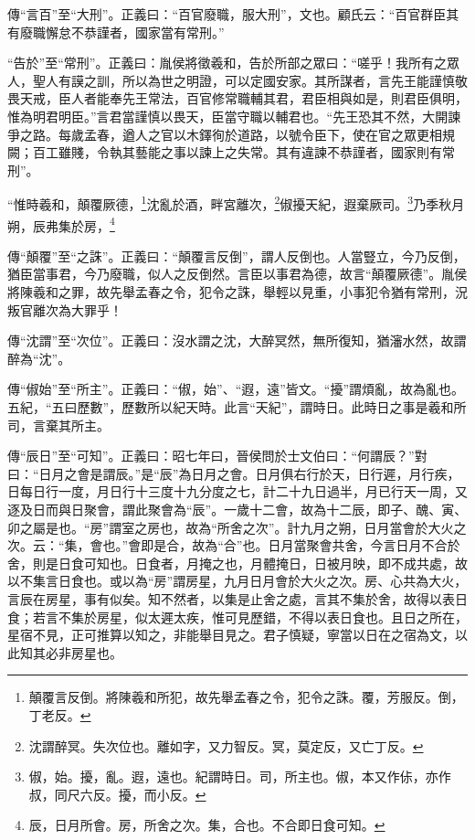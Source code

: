 {\noindent\zhuan{}\fzbyks 傳“言百”至“大刑”。正義曰：“百官廢職，服大刑”，文也。顧氏云：“百官群臣其有廢職懈怠不恭謹者，國家當有常刑。” \par}

{\noindent\shu{}\fzkt “告於”至“常刑”。正義曰：胤侯將徵羲和，告於所部之眾曰：“嗟乎！我所有之眾人，聖人有謨之訓，所以為世之明證，可以定國安家。其所謀者，言先王能謹慎敬畏天戒，臣人者能奉先王常法，百官修常職輔其君，君臣相與如是，則君臣俱明，惟為明君明臣。”言君當謹慎以畏天，臣當守職以輔君也。“先王恐其不然，大開諫爭之路。每歲孟春，遒人之官以木鐸徇於道路，以號令臣下，使在官之眾更相規闕；百工雖賤，令執其藝能之事以諫上之失常。其有違諫不恭謹者，國家則有常刑”。 \par}

“惟時羲和，顛覆厥德，\footnote{顛覆言反倒。將陳羲和所犯，故先舉孟春之令，犯令之誅。覆，芳服反。倒，丁老反。}沈亂於酒，畔宮離次，\footnote{沈謂醉冥。失次位也。離如字，又力智反。冥，莫定反，又亡丁反。}俶擾天紀，遐棄厥司。\footnote{俶，始。擾，亂。遐，遠也。紀謂時日。司，所主也。俶，本又作㑐，亦作叔，同尺六反。擾，而小反。}乃季秋月朔，辰弗集於房，\footnote{辰，日月所會。房，所舍之次。集，合也。不合即日食可知。}

{\noindent\zhuan{}\fzbyks 傳“顛覆”至“之誅”。正義曰：“顛覆言反倒”，謂人反倒也。人當豎立，今乃反倒，猶臣當事君，今乃廢職，似人之反倒然。言臣以事君為德，故言“顛覆厥德”。胤侯將陳羲和之罪，故先舉孟春之令，犯令之誅，舉輕以見重，小事犯令猶有常刑，況叛官離次為大罪乎！ \par}

{\noindent\zhuan{}\fzbyks 傳“沈謂”至“次位”。正義曰：沒水謂之沈，大醉冥然，無所復知，猶瀋水然，故謂醉為“沈”。 \par}

{\noindent\zhuan{}\fzbyks 傳“俶始”至“所主”。正義曰：“俶，始”、“遐，遠”皆文。“擾”謂煩亂，故為亂也。五紀，“五曰歷數”，歷數所以紀天時。此言“天紀”，謂時日。此時日之事是羲和所司，言棄其所主。 \par}

{\noindent\zhuan{}\fzbyks 傳“辰日”至“可知”。正義曰：昭七年曰，晉侯問於士文伯曰：“何謂辰？”對曰：“日月之會是謂辰。”是“辰”為日月之會。日月俱右行於天，日行遲，月行疾，日每日行一度，月日行十三度十九分度之七，計二十九日過半，月已行天一周，又逐及日而與日聚會，謂此聚會為“辰”。一歲十二會，故為十二辰，即子、醜、寅、卯之屬是也。“房”謂室之房也，故為“所舍之次”。計九月之朔，日月當會於大火之次。云：“集，會也。”會即是合，故為“合”也。日月當聚會共舍，今言日月不合於舍，則是日食可知也。日食者，月掩之也，月體掩日，日被月映，即不成共處，故以不集言日食也。或以為“房”謂房星，九月日月會於大火之次。房、心共為大火，言辰在房星，事有似矣。知不然者，以集是止舍之處，言其不集於舍，故得以表日食；若言不集於房星，似太遲太疾，惟可見歷錯，不得以表日食也。且日之所在，星宿不見，正可推算以知之，非能舉目見之。君子慎疑，寧當以日在之宿為文，以此知其必非房星也。 \par}

